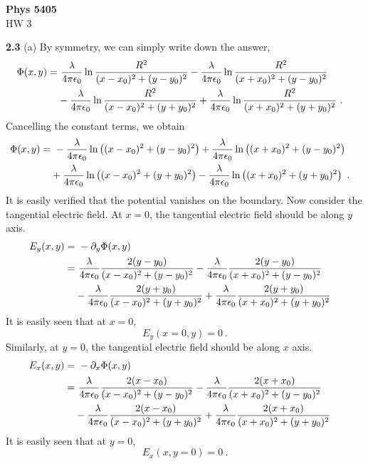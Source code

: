 \documentclass[12pt]{article}
\begin{document}
\begin{center}
{\bf Phys 5405}\\
HW 3
\end{center}
\textbf{2.3} (a) By symmetry, we can simply write down the answer,
\begin{align}
    \Phi(x,y) = &~ \frac{\lambda}{4 \pi \epsilon_0} \ln\frac{R^2}{(x-x_0)^2 + (y - y_0)^2}
    - \frac{\lambda}{4 \pi \epsilon_0} \ln\frac{R^2}{(x+x_0)^2 + (y - y_0)^2}\cr
    &- \frac{\lambda}{4 \pi \epsilon_0} \ln\frac{R^2}{(x-x_0)^2 + (y + y_0)^2} + \frac{\lambda}{4 \pi \epsilon_0} \ln\frac{R^2}{(x+x_0)^2 + (y + y_0)^2}~.\nonumber
\end{align}
Cancelling the constant terms, we obtain
\begin{align}
    \Phi(x,y) = &~ -\frac{\lambda}{4 \pi \epsilon_0} \ln\left({(x-x_0)^2 + (y - y_0)^2}\right)
    + \frac{\lambda}{4 \pi \epsilon_0} \ln\left({(x+x_0)^2 + (y - y_0)^2}\right)\cr
    &+ \frac{\lambda}{4 \pi \epsilon_0} \ln\left({(x-x_0)^2 + (y + y_0)^2}\right) - \frac{\lambda}{4 \pi \epsilon_0} \ln\left({(x+x_0)^2 + (y + y_0)^2}\right)~.\nonumber
\end{align}
It is easily verified that the potential vanishes on the boundary. Now consider the tangential electric field. At $x = 0$, the tangential electric field should be along $y$ axis.
\begin{align} \label{eqn:partial-y}
    E_y(x,y) =&~ - \partial_y \Phi(x,y) \cr
    =&~ \frac{\lambda}{4\pi\epsilon_0} \frac{2(y-y_0)}{(x-x_0)^2 + (y - y_0)^2} - \frac{\lambda}{4\pi\epsilon_0} \frac{2(y-y_0)}{(x+x_0)^2 + (y - y_0)^2}\cr
    &-\frac{\lambda}{4\pi\epsilon_0} \frac{2(y+y_0)}{(x-x_0)^2 + (y + y_0)^2} + \frac{\lambda}{4\pi\epsilon_0} \frac{2(y+y_0)}{(x+x_0)^2 + (y + y_0)^2}
\end{align}
It is easily seen that at $x = 0$,
\begin{equation}
    E_y (x=0,y) = 0~.
\end{equation}
Similarly, at $y = 0$, the tangential electric field should be along $x$ axis.
\begin{align} \label{eqn:partial-x}
    E_x(x,y) =&~ - \partial_x \Phi(x,y) \cr
    =&~ \frac{\lambda}{4\pi\epsilon_0} \frac{2(x-x_0)}{(x-x_0)^2 + (y - y_0)^2} - \frac{\lambda}{4\pi\epsilon_0} \frac{2(x+x_0)}{(x+x_0)^2 + (y - y_0)^2}\cr
    &-\frac{\lambda}{4\pi\epsilon_0} \frac{2(x-x_0)}{(x-x_0)^2 + (y + y_0)^2} + \frac{\lambda}{4\pi\epsilon_0} \frac{2(x+x_0)}{(x+x_0)^2 + (y + y_0)^2}
\end{align}
It is easily seen that at $y = 0$,
\begin{equation}
    E_x(x,y=0) = 0~.
\end{equation}
\end{document}

